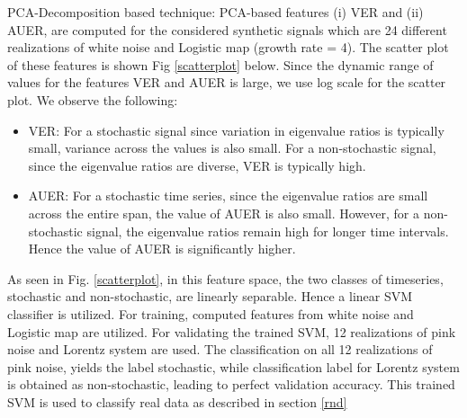 \documentclass[journal]{IEEEtran}
\begin{document}
	
		PCA-Decomposition based technique: PCA-based features (i) VER and (ii) AUER,  are computed for the considered synthetic signals which are 24 different realizations of white noise and Logistic map (growth rate = 4). The scatter plot of these features is shown Fig \ref{scatterplot} below. Since the dynamic range of values for the features VER and AUER is large, we use log scale for the scatter plot. We observe the following:
	\begin{itemize}
		\item VER: For a stochastic signal since variation in eigenvalue ratios is typically small, variance across the values is also small. For a non-stochastic signal, since the eigenvalue ratios are diverse, VER is typically high.
		\item AUER: For a stochastic time series, since the eigenvalue ratios  are small across the entire span, the value of AUER is also small. However, for a non-stochastic signal, the eigenvalue ratios remain high for longer time intervals. Hence the value of AUER is significantly higher.
	\end{itemize}


	As seen in Fig. \ref{scatterplot},  in this feature space, the two classes of timeseries, stochastic and non-stochastic, are linearly separable. Hence a linear SVM classifier is utilized. For training, computed features from white noise and Logistic map are utilized. For validating the trained SVM, 12 realizations of pink noise and Lorentz system are used. The classification on all 12 realizations of pink noise, yields the label stochastic, while classification label for Lorentz system is obtained as non-stochastic, leading to perfect validation accuracy. This trained SVM is used to classify real data as described in section \ref{rnd}
	
\end{document}
